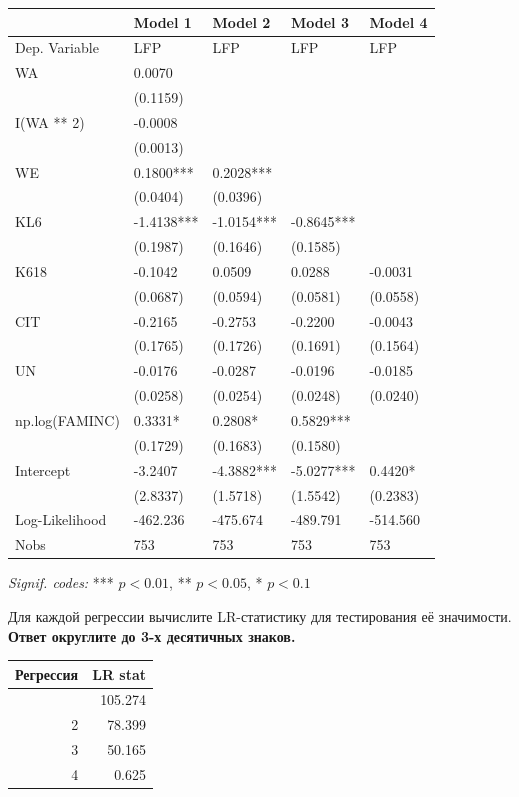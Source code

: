 \documentclass[
  russian,
]{article}
\newcounter{none} %
\begin{document}
{\def\LTcaptype{none} %
\begin{longtable}[]{@{}lllll@{}}
\toprule\noalign{}
& Model 1 & Model 2 & Model 3 & Model 4 \\
\midrule\noalign{}
\endhead
\bottomrule\noalign{}
\endlastfoot
Dep. Variable & LFP & LFP & LFP & LFP \\
WA & 0.0070 & & & \\
& (0.1159) & & & \\
I(WA ** 2) & -0.0008 & & & \\
& (0.0013) & & & \\
WE & 0.1800*** & 0.2028*** & & \\
& (0.0404) & (0.0396) & & \\
KL6 & -1.4138*** & -1.0154*** & -0.8645*** & \\
& (0.1987) & (0.1646) & (0.1585) & \\
K618 & -0.1042 & 0.0509 & 0.0288 & -0.0031 \\
& (0.0687) & (0.0594) & (0.0581) & (0.0558) \\
CIT & -0.2165 & -0.2753 & -0.2200 & -0.0043 \\
& (0.1765) & (0.1726) & (0.1691) & (0.1564) \\
UN & -0.0176 & -0.0287 & -0.0196 & -0.0185 \\
& (0.0258) & (0.0254) & (0.0248) & (0.0240) \\
np.log(FAMINC) & 0.3331* & 0.2808* & 0.5829*** & \\
& (0.1729) & (0.1683) & (0.1580) & \\
Intercept & -3.2407 & -4.3882*** & -5.0277*** & 0.4420* \\
& (2.8337) & (1.5718) & (1.5542) & (0.2383) \\
Log-Likelihood & -462.236 & -475.674 & -489.791 & -514.560 \\
Nobs & 753 & 753 & 753 & 753 \\
\end{longtable}
}

\emph{Signif. codes:} *** \(p<0.01\), ** \(p<0.05\), * \(p<0.1\)

Для каждой регрессии вычислите LR-статистику для тестирования её
значимости. \textbf{Ответ округлите до 3-х десятичных знаков.}

{\def\LTcaptype{none} %
\begin{longtable}[]{@{}rr@{}}
\toprule\noalign{}
Регрессия & LR stat \\
\midrule\noalign{}
\endhead
\bottomrule\noalign{}
\endlastfoot
1 & 105.274 \\
2 & 78.399 \\
3 & 50.165 \\
4 & 0.625 \\
\end{longtable}
}
\end{document}
